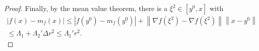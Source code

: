 \begin{proof}
Finally, by the mean value theorem, there is a $\xi^2 \in [y^0, x]$ with
\begin{align*}
\left|f(x) - m_f(x)\right|
\le \left| f(y^0) - m_f(y^0) \right| + \left\| \nabla f(\xi^2) - \nabla f(\xi^2) \right\| \left\|x - y^0\right\| \\
\le \Lambda_1 + \Lambda_2' \Delta r^2
\le \Lambda_1' r^2.
\end{align*}
% 
% 
% 
% 
% 
% 
% 
% 
% 
% 
% 
% 

\end{proof}
